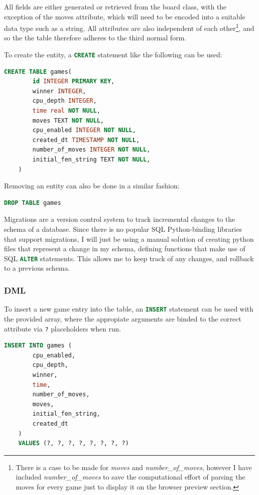 \documentclass[../main/main.tex]{subfiles}
\begin{document}
All fields are either generated or retrieved from the board class, with the exception of the moves attribute, which will need to be encoded into a suitable data type such as a string. All attributes are also independent of each other\footnote{There is a case to be made for \textit{moves} and \textit{number\_of\_moves}, however I have included \textit{number\_of\_moves} to save the computational effort of parsing the moves for every game just to display it on the browser preview section.}, and so the the table therefore adheres to the third normal form.

To create the entity, a \lstinline[language=SQL]{CREATE} statement like the following can be used:

\begin{lstlisting}[language=SQL, frame=single]
    CREATE TABLE games(
        id INTEGER PRIMARY KEY,
        winner INTEGER,
        cpu_depth INTEGER,
        time real NOT NULL,
        moves TEXT NOT NULL,
        cpu_enabled INTEGER NOT NULL,
        created_dt TIMESTAMP NOT NULL,
        number_of_moves INTEGER NOT NULL,
        initial_fen_string TEXT NOT NULL,
    )
\end{lstlisting}

\noindent Removing an entity can also be done in a similar fashion:

\begin{lstlisting}[language=SQL, frame=single]
    DROP TABLE games
\end{lstlisting}

Migrations are a version control system to track incremental changes to the schema of a database. Since there is no popular SQL Python-binding libraries that support migrations, I will just be using a manual solution of creating python files that represent a change in my schema, defining functions that make use of SQL \lstinline[language=SQL]{ALTER} statements. This allows me to keep track of any changes, and rollback to a previous schema.

\subsubsection*{DML}
To insert a new game entry into the table, an \lstinline[language=SQL]{INSERT} statement can be used with the provided array, where the appropiate arguments are binded to the correct attribute via \lstinline[language=Python]{?} placeholders when run.

\begin{lstlisting}[language=SQL, frame=single]
    INSERT INTO games (
        cpu_enabled,
        cpu_depth,
        winner,
        time,
        number_of_moves,
        moves,
        initial_fen_string,
        created_dt
    )
    VALUES (?, ?, ?, ?, ?, ?, ?, ?)
\end{lstlisting}
\end{document}

